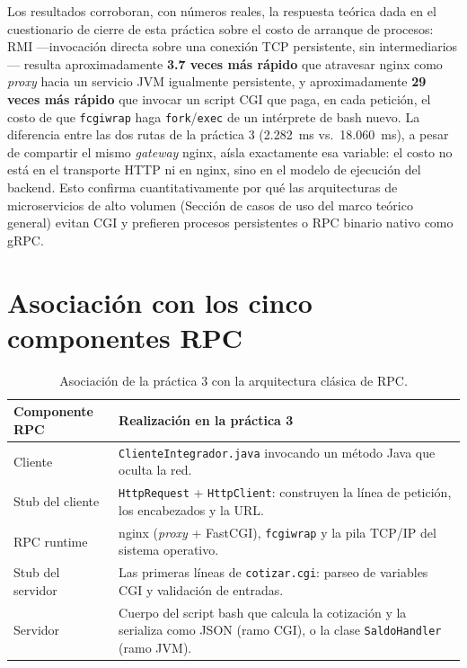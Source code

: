 Los resultados corroboran, con números reales, la respuesta teórica dada en el cuestionario de cierre de esta práctica sobre el costo de arranque de procesos: RMI —invocación directa sobre una conexión TCP persistente, sin intermediarios— resulta aproximadamente \textbf{3.7 veces más rápido} que atravesar nginx como \emph{proxy} hacia un servicio JVM igualmente persistente, y aproximadamente \textbf{29 veces más rápido} que invocar un script CGI que paga, en cada petición, el costo de que \texttt{fcgiwrap} haga \texttt{fork}/\texttt{exec} de un intérprete de bash nuevo. La diferencia entre las dos rutas de la práctica 3 (2.282~ms vs.\ 18.060~ms), a pesar de compartir el mismo \emph{gateway} nginx, aísla exactamente esa variable: el costo no está en el transporte HTTP ni en nginx, sino en el modelo de ejecución del backend. Esto confirma cuantitativamente por qué las arquitecturas de microservicios de alto volumen (Sección de casos de uso del marco teórico general) evitan CGI y prefieren procesos persistentes o RPC binario nativo como gRPC.

\section{Asociación con los cinco componentes RPC}

\begin{table}[H]
\centering
\caption{Asociación de la práctica 3 con la arquitectura clásica de RPC.}
\label{tab:componentes-rpc-p3}
\begin{tabularx}{\linewidth}{lX}
\toprule
\textbf{Componente RPC} & \textbf{Realización en la práctica 3} \\
\midrule
Cliente & \texttt{ClienteIntegrador.java} invocando un método Java que oculta la red. \\
Stub del cliente & \texttt{HttpRequest} + \texttt{HttpClient}: construyen la línea de petición, los encabezados y la URL. \\
RPC runtime & nginx (\emph{proxy} + FastCGI), \texttt{fcgiwrap} y la pila TCP/IP del sistema operativo. \\
Stub del servidor & Las primeras líneas de \texttt{cotizar.cgi}: parseo de variables CGI y validación de entradas. \\
Servidor & Cuerpo del script bash que calcula la cotización y la serializa como JSON (ramo CGI), o la clase \texttt{SaldoHandler} (ramo JVM). \\
\bottomrule
\end{tabularx}
\end{table}
